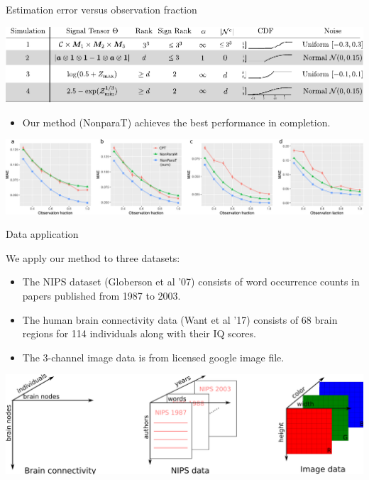 \documentclass[10pt, mathserif]{beamer} %
\theoremstyle{definition}
\theoremstyle{plain}
\begin{document}
\begin{frame}{Estimation error versus observation fraction}

    \begin{center}
        \includegraphics[width = \textwidth]{Figures/simulation.pdf}
        \end{center}
        
  \begin{itemize}
    \item Our method (NonparaT) achieves the best performance in completion. 
  \end{itemize}
    
    \begin{center}
  \includegraphics[width =\textwidth]{Figures/fig5-8v2.pdf}
  \end{center}
    
\end{frame}


\begin{frame}{Data application}

We apply our method to three datasets:
\begin{itemize}
\item The NIPS dataset (Globerson et al '07) consists of word occurrence counts in papers published from 1987 to 2003.

\item The human brain connectivity data (Want et al '17) consists of 68 brain regions for 114 individuals along with their IQ scores.

\item The 3-channel image data is from licensed google image file.


\end{itemize}
    \begin{center}
    \includegraphics[width =\textwidth]{Figures/ndataset.pdf}
    \end{center}
\end{frame}
\end{document}
